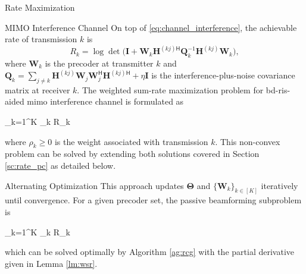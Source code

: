 \documentclass[journal]{IEEEtran}
\begin{document}
\begin{section}{Rate Maximization}
		\begin{subsection}{MIMO Interference Channel}
			On top of \eqref{eq:channel_interference}, the achievable rate of transmission $k$ is
			\begin{equation}
				R_k = \log \det \biggl(\mathbf{I} + \mathbf{W}_k {\mathbf{H}^{(kj)\mathsf{H}}} \mathbf{Q}_k^{-1} {\mathbf{H}^{(kj)}} \mathbf{W}_k\biggr),
			\end{equation}
			where $\mathbf{W}_k$ is the precoder at transmitter $k$ and $\mathbf{Q}_k = \sum_{j \ne k} {\mathbf{H}^{(kj)}} \mathbf{W}_j \mathbf{W}_j^\mathsf{H} {\mathbf{H}^{(kj)\mathsf{H}}} + \eta \mathbf{I}$ is the interference-plus-noise covariance matrix at receiver $k$.
			The weighted sum-rate maximization problem for \gls{bd}-\gls{ris}-aided \gls{mimo} interference channel is formulated as
			\begin{maxi!}
				{}{\sum_{k=1}^K \rho_k R_k}{\label{op:wsr}}{\label{ob:wsr}}
			\end{maxi!}
			where $\rho_k \ge 0$ is the weight associated with transmission $k$.
			This non-convex problem can be solved by extending both solutions covered in Section \ref{sc:rate_pc} as detailed below.

			\begin{subsubsection}{Alternating Optimization}
				This approach updates $\mathbf{\Theta}$ and $\{\mathbf{W}_k\}_{k \in [K]}$ iteratively until convergence.
				For a given precoder set, the passive beamforming subproblem is
				\begin{maxi!}
					{\scriptstyle{\mathbf{\Theta}}}{\sum_{k=1}^K \rho_k R_k}{\label{op:wsr_ris}}{\label{ob:wsr_ris}}
					\addConstraint{\mathbf{\Theta}_g^\mathsf{H} \mathbf{\Theta}_g=\mathbf{I}, \quad \forall g,}{}{}
				\end{maxi!}
				which can be solved optimally by Algorithm \ref{ag:rcg} with the partial derivative given in Lemma \ref{lm:wsr}.


\end{subsubsection}
\end{subsection}
\end{section}
\end{document}
